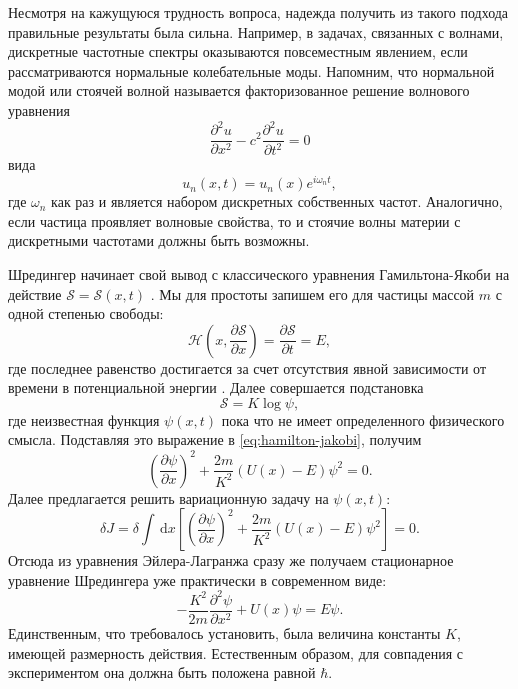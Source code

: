 \documentclass[14pt, a4paper]{extreport}
\newcommand{\diff}{\,\mathrm{d}}
\numberwithin{equation}{section}
\begin{document}
Несмотря на кажущуюся трудность вопроса, надежда получить из такого подхода правильные результаты была сильна. Например, в задачах, связанных с волнами, дискретные частотные спектры оказываются повсеместным явлением, если рассматриваются нормальные колебательные моды. Напомним, что нормальной модой или стоячей волной называется факторизованное решение волнового уравнения
\begin{equation}
	\frac{\partial^2 u}{\partial x^2} - c^2 \frac{\partial^2 u}{\partial t^2} = 0\label{eq:wave_eq}
\end{equation}
вида
\begin{equation}
	u_n(x, t) = u_n(x) e^{i\omega_n t},
\end{equation}
где ${\omega_n}$ как раз и является набором дискретных собственных частот. Аналогично, если частица проявляет волновые свойства, то и стоячие волны материи с дискретными частотами должны быть возможны.

Шредингер начинает свой вывод с классического уравнения Гамильтона-Якоби на действие $\mathcal{S} = \mathcal S (x,t)$ \cite{schrodinger2003collected}. Мы для простоты запишем его для частицы массой $m$ с одной степенью свободы:
\begin{equation}
	\mathcal{H}\left(x, \frac{\partial \mathcal S}{\partial x}\right) = \frac{\partial \mathcal S}{\partial t} = E, \label{eq:hamilton-jakobi}
\end{equation}
где последнее равенство достигается за счет отсутствия явной зависимости от времени в потенциальной энергии \cite{shmutzer1976}. Далее совершается подстановка
\begin{equation}
	\mathcal S = K \log \psi, \label{eq:psi_action}
\end{equation}
где неизвестная функция $\psi(x,t)$ пока что не имеет определенного физического смысла. Подставляя это выражение в \eqref{eq:hamilton-jakobi}, получим
\begin{equation}
	\left(\frac{\partial \psi}{\partial x} \right)^2 + \frac{2m}{K^2}(U(x) - E)\psi^2 = 0.
\end{equation}
Далее предлагается решить вариационную задачу на $\psi(x, t)$:
\begin{equation}
	\delta J = \delta \int \diff x \left[ \left(\frac{\partial \psi}{\partial x} \right)^2 +  \frac{2m}{K^2}(U(x) - E)\psi^2 \right] = 0.
\end{equation}
Отсюда из уравнения Эйлера-Лагранжа \cite{hilbertcourant} сразу же получаем стационарное уравнение Шредингера уже практически в современном виде:
\begin{equation}
	-\frac{K^2}{2m}\frac{\partial^2 \psi}{\partial x^2} + U(x)\psi = E \psi.\label{eq:shroedinger_stationary}
\end{equation}
Единственным, что требовалось установить, была величина константы $K$, имеющей размерность действия. Естественным образом, для совпадения с экспериментом она должна быть положена равной $\hbar$.
\end{document}
